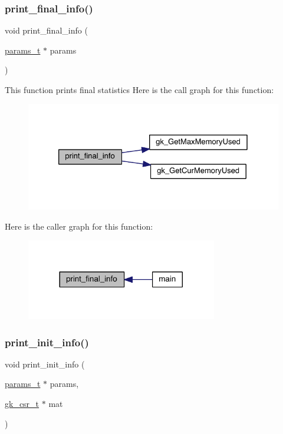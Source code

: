 \subsubsection{\texorpdfstring{print\+\_\+final\+\_\+info()}{print\_final\_info()}}
{\footnotesize\ttfamily void print\+\_\+final\+\_\+info (\begin{DoxyParamCaption}\item[{\hyperlink{a00706}{params\+\_\+t} $\ast$}]{params }\end{DoxyParamCaption})}

This function prints final statistics Here is the call graph for this function\+:\nopagebreak
\begin{figure}[H]
\begin{center}
\leavevmode
\includegraphics[width=326pt]{a00146_a702976a4c55992ddbfc1918ec1b70943_cgraph}
\end{center}
\end{figure}
Here is the caller graph for this function\+:\nopagebreak
\begin{figure}[H]
\begin{center}
\leavevmode
\includegraphics[width=236pt]{a00146_a702976a4c55992ddbfc1918ec1b70943_icgraph}
\end{center}
\end{figure}
\mbox{\label{a00146_a2270624f104a1d261314dd112e4a1d1d}} 
\subsubsection{\texorpdfstring{print\+\_\+init\+\_\+info()}{print\_init\_info()}}
{\footnotesize\ttfamily void print\+\_\+init\+\_\+info (\begin{DoxyParamCaption}\item[{\hyperlink{a00706}{params\+\_\+t} $\ast$}]{params,  }\item[{\hyperlink{a00634}{gk\+\_\+csr\+\_\+t} $\ast$}]{mat }\end{DoxyParamCaption})}

